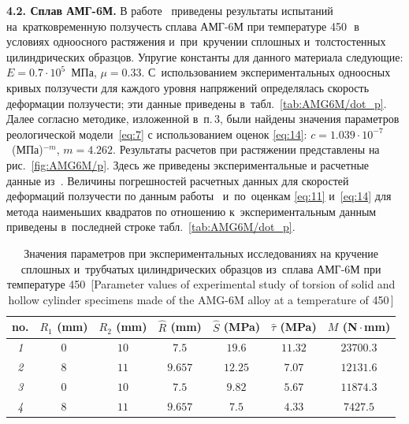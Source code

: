 \textbf{4.2. Сплав АМГ-6М.}
В работе~\cite{Larichkin} приведены результаты испытаний на~кратковременную ползучесть сплава АМГ-6М при температуре 450\,\textcelsius\ в условиях одноосного растяжения и~при~кручении сплошных и~толстостенных цилиндрических образцов. Упругие константы для данного материала следующие: $E=0.7\cdot 10^5$~МПа, $\mu=0.33$. 
С~использованием экспериментальных одноосных кривых ползучести \cite[рис.~3]{Larichkin} для каждого уровня напряжений определялась скорость деформации ползучести; 
эти данные приведены в~табл.~\ref{tab:AMG6M/dot_p}. 
Далее согласно методике, изложенной в~п.\,3, были найдены значения параметров реологической модели~\eqref{eq:7} с использованием оценок \eqref{eq:14}: $c= 1.039 \cdot 10^{-7}$~(МПа)$^{-m}$, $m=4.262$.
Результаты расчетов при растяжении представлены на рис.~\ref{fig:AMG6M/p}. 
Здесь же приведены экспериментальные и расчетные данные из~\cite{Larichkin}. 
Величины погрешностей расчетных данных для скоростей деформаций ползучести по данным работы~\cite{Larichkin} и~по~оценкам \eqref{eq:11} и~\eqref{eq:14} для метода наименьших квадратов по отношению к~экспериментальным данным приведены в~последней строке табл.~\ref{tab:AMG6M/dot_p}.








\begin{table}[h!]

\footnotesize

\caption{Значения параметров при экспериментальных исследованиях на кручение сплошных и~трубчатых цилиндрических образцов из~сплава АМГ-6М при температуре 450\,\textcelsius
 \label{tab:AMG6M/moments} 
[Parameter values of experimental study of torsion of solid and hollow cylinder specimens made of
the AMG-6M alloy at a temperature of 450\,\textcelsius]}
\vspace{-3mm}\small
\renewcommand{\tabcolsep}{0.36cm}
\begin{tabular}{c|c|c|c|c|c|c} 
	\hline 
\rule{0mm}{12pt}%
\footnotesize no. &
\footnotesize $R_1$ (mm)&
\footnotesize $R_2$ (mm)&
\footnotesize $\hat{R}$ (mm)&
\footnotesize $\hat{S}$ (MPa)&
\footnotesize $\hat{\tau}$ (MPa) &
\footnotesize $M$ (N${}\cdot{}$mm) \\ 
	\hline 		
\rule{0mm}{12pt}%
\sl 1 & $0$ & $10$ & $7.5$ & $19.6$ & $11.32$ & $23700.3$	\\ 
\sl 2 & $8$ & $11$ & $9.657$ & $12.25$ & $7.07$ & $12131.6$	\\ 
\sl 3 & $0$ & $10$ & $7.5$ & $9.82$ & $5.67$ & $11874.3$	\\ 
\sl 4 & $8$ & $11$ & $9.657$ & $7.5$ & $4.33$ & $7427.5$	\\ 
	\hline 
\end{tabular}

\vspace{-5mm}
\end{table}



